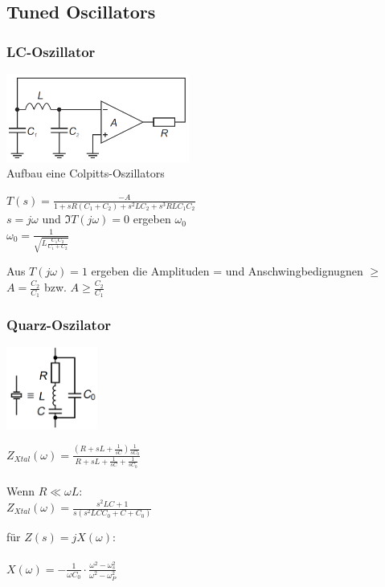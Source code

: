\subsection{Tuned Oscillators}	
\subsubsection{LC-Oszillator}
	\begin{multicols}{3}
		\includegraphics[width=6cm]{images/osziLC.png}\\
		Aufbau eine Colpitts-Oszillators
		\columnbreak
		
		$T\left(s\right)=\frac{-A}{1+sR\left(C_1+C_2\right)+s^2LC_2+s^3RLC_1C_2}$\\
		$s=j\omega$ und $\Im{T\left(j\omega\right)}=0$ ergeben $\omega_0$\\
		$\omega_0=\frac{1}{\sqrt{L\frac{C_1 C_2}{C_1+C_2}}}$\\
		\columnbreak
		
		Aus $T\left(j\omega\right)=1$ ergeben die Amplituden = und Anschwingbedignugnen
		$\geq$
		$A=\frac{C_2}{C_1}$ bzw. $A\geq\frac{C_2}{C_1}$
	\end{multicols}
\subsubsection{Quarz-Oszilator}
	\begin{multicols}{3}
		\includegraphics[width=3cm]{images/osziCrystal.png}
		\columnbreak
		
		$Z_{Xtal}\left(\omega\right)=\frac{\left(R+sL+\frac{1}{sC}\right)\frac{1}{sC_0}}{R+sL+\frac{1}{sC}+\frac{1}{sC_0}}$\\
		\\
		Wenn $R \ll \omega L$:\\
		$Z_{Xtal}\left(\omega\right)=\frac{s^2LC+1}{s\left(s^2LCC_0+C+C_0\right)}$\\
		\columnbreak
		
		f\"ur $Z\left(s\right)=jX\left(\omega\right)$:\\
		\\
		$X\left(\omega\right)=-\frac{1}{\omega C_0}\cdot \frac{\omega^2 -
		\omega_s^2}{\omega^2-\omega^2_P}$
	\end{multicols}